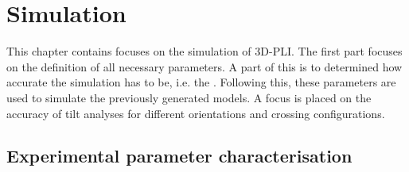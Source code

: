 \setcounter{chapter}{7}
\chapter{Simulation}
\label{cha:simulation_analysis}
% 
% 
% 
This chapter contains focuses on the simulation of \ac{3D-PLI}.
The first part focuses on the definition of all necessary parameters.
A part of this is to determined how accurate the simulation has to be, i.e. the \voxelsize{}.
Following this, these parameters are used to simulate the previously generated models.
A focus is placed on the accuracy of tilt analyses for different orientations and crossing configurations.
% 
% 
% 
\section{Experimental parameter characterisation}\label{sec:sim_choose_parameters}
% 
